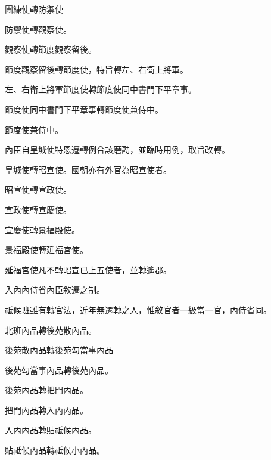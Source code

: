 \begin{pinyinscope}
 團練使轉防禦使



 防禦使轉觀察使。



 觀察使轉節度觀察留後。



 節度觀察留後轉節度使，特旨轉左、右衛上將軍。



 左、右衛上將軍節度使轉節度使同中書門下平章事。



 節度使同中書門下平章事轉節度使兼侍中。



 節度使兼侍中。



 內臣自皇城使特恩遷轉例合該磨勘，並臨時用例，取旨改轉。



 皇城使轉昭宣使。國朝亦有外官為昭宣使者。



 昭宣使轉宣政使。



 宣政使轉宣慶使。



 宣慶使轉景福殿使。



 景福殿使轉延福宮使。



 延福宮使凡不轉昭宣已上五使者，並轉遙郡。



 入內內侍省內臣敘遷之制。



 祗候班雖有轉官法，近年無遷轉之人，惟敘官者一級當一官，內侍省同。



 北班內品轉後苑散內品。



 後苑散內品轉後苑勾當事內品



 後苑勾當事內品轉後苑內品。



 後苑內品轉把門內品。



 把門內品轉入內內品。



 入內內品轉貼祗候內品。



 貼祗候內品轉祗候小內品。




\end{pinyinscope}
